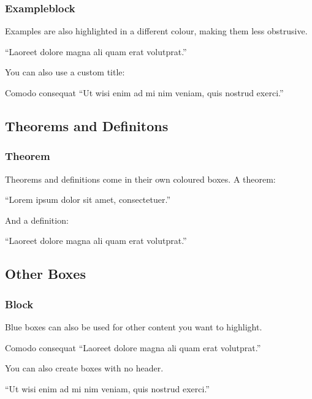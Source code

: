 \documentclass{beamer}
\begin{document}
\begin{frame}
  \frametitle{Exampleblock}

  Examples are also highlighted in a different colour, making them less obstrusive.

  \begin{example}
    ``Laoreet dolore magna ali quam erat volutprat.''
  \end{example}

  You can also use a custom title:

  \begin{exampleblock}{Comodo consequat}
    ``Ut wisi enim ad mi nim veniam, quis nostrud exerci.''
  \end{exampleblock}

\end{frame}

\subsection{Theorems and Definitons}

\begin{frame}
  \frametitle{Theorem}

  Theorems and definitions come in their own coloured boxes. A theorem:

  \begin{theorem}
    ``Lorem ipsum dolor sit amet, consectetuer.''
  \end{theorem}

  And a definition:

  \begin{definition}
    ``Laoreet dolore magna ali quam erat volutprat.''
  \end{definition}

\end{frame}


\subsection{Other Boxes}

\begin{frame}
  \frametitle{Block}

  Blue boxes can also be used for other content you want to highlight.

  \begin{block}{Comodo consequat}
    ``Laoreet dolore magna ali quam erat volutprat.''
  \end{block}

  You can also create boxes with no header.

  \begin{block}{}
    ``Ut wisi enim ad mi nim veniam, quis nostrud exerci.''
  \end{block}

\end{frame}
\end{document}
